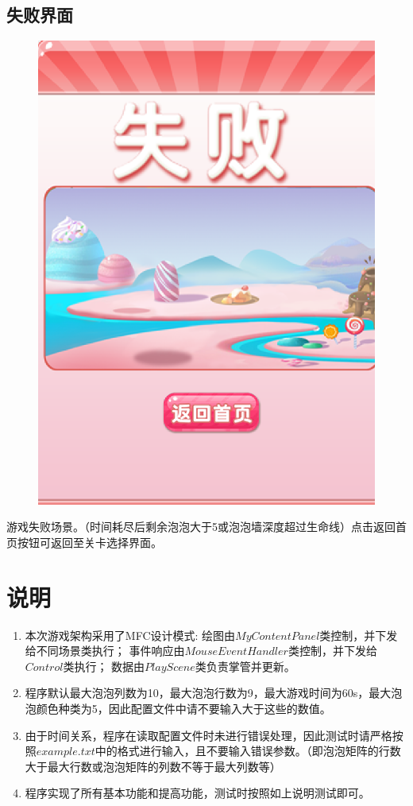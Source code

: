 \documentclass{article}
\begin{document}
            \subsection{失败界面}
            \begin{figure}[H]
                \centering
                \includegraphics[scale=0.5]{fail.png}
            \end{figure}
            游戏失败场景。（时间耗尽后剩余泡泡大于5或泡泡墙深度超过生命线）点击返回首页按钮可返回至关卡选择界面。

    \section{说明}
    \begin{enumerate}
        \item 本次游戏架构采用了MFC设计模式:
        绘图由$MyContentPanel$类控制，并下发给不同场景类执行；
        事件响应由$MouseEventHandler$类控制，并下发给$Control$类执行；
        数据由$PlayScene$类负责掌管并更新。
        \item 程序默认最大泡泡列数为10，最大泡泡行数为9，最大游戏时间为60s，最大泡泡颜色种类为5，因此配置文件中请不要输入大于这些的数值。
        \item 由于时间关系，程序在读取配置文件时未进行错误处理，因此测试时请严格按照$example.txt$中的格式进行输入，且不要输入错误参数。（即泡泡矩阵的行数大于最大行数或泡泡矩阵的列数不等于最大列数等）
        \item 程序实现了所有基本功能和提高功能，测试时按照如上说明测试即可。
    \end{enumerate}
    
\end{document}
